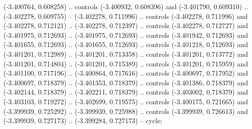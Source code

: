     (-3.400764, 0.608258) .. controls (-3.400932, 0.608396) and (-3.401790, 0.609310) ..
    (-3.402278, 0.609755) --
    (-3.402278, 0.711996) .. controls (-3.402278, 0.711996) and (-3.402278, 0.712121) ..
    (-3.402278, 0.712397) .. controls (-3.402278, 0.712727) and (-3.401975, 0.712693) ..
    (-3.401975, 0.712693) .. controls (-3.401942, 0.712693) and (-3.401655, 0.712693) ..
    (-3.401655, 0.712693) .. controls (-3.401218, 0.712693) and (-3.401201, 0.712989) ..
    (-3.401201, 0.713358) .. controls (-3.401201, 0.713772) and (-3.401201, 0.714804) ..
    (-3.401201, 0.715389) .. controls (-3.401201, 0.715959) and (-3.401100, 0.717196) ..
    (-3.400864, 0.717616) .. controls (-3.400697, 0.717952) and (-3.400697, 0.718379) ..
    (-3.401353, 0.718379) .. controls (-3.401386, 0.718379) and (-3.402144, 0.718379) ..
    (-3.402211, 0.718379) .. controls (-3.403002, 0.718379) and (-3.403103, 0.719272) ..
    (-3.402699, 0.719575) .. controls (-3.400175, 0.721665) and (-3.399939, 0.725292) ..
    (-3.399939, 0.725988) .. controls (-3.399939, 0.726613) and (-3.399939, 0.727173) ..
    (-3.399284, 0.727173) --
    cycle;

